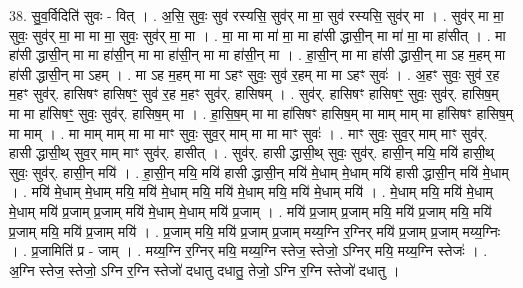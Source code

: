 \documentclass[17pt]{extarticle}
\begin{document}
38. सु॒व॒र्विदिति॑ सुवः - वित् । . अ॒सि॒ सुवः॒ सुव॑ रस्यसि॒ सुव॑र् मा मा॒ सुव॑ रस्यसि॒ सुव॑र् मा । . सुव॑र् मा मा॒ सुवः॒ सुव॑र् मा॒ मा मा मा॒ सुवः॒ सुव॑र् मा॒ मा । . मा॒ मा मा मा॑ मा॒ मा हा॑सी द्धासी॒न् मा मा॑ मा॒ मा हा॑सीत् । . मा हा॑सी द्धासी॒न् मा मा हा॑सी॒न् मा मा हा॑सी॒न् मा मा हा॑सी॒न् मा । . हा॒सी॒न् मा मा हा॑सी द्धासी॒न् मा ऽह म॒हम् मा हा॑सी द्धासी॒न् मा ऽहम् । . मा ऽह म॒हम् मा मा ऽहꣳ सुवः॒ सुव॑ र॒हम् मा मा ऽहꣳ सुवः॑ । . अ॒हꣳ सुवः॒ सुव॑ र॒ह म॒हꣳ सुव॑र्. हासिषꣳ हासिषꣳ॒॒ सुव॑ र॒ह म॒हꣳ सुव॑र्. हासिषम् । . सुव॑र्. हासिषꣳ हासिषꣳ॒॒ सुवः॒ सुव॑र्. हासिष॒म् मा मा हा॑सिषꣳ॒॒ सुवः॒ सुव॑र्. हासिष॒म् मा । . हा॒सि॒ष॒म् मा मा हा॑सिषꣳ हासिष॒म् मा माम् माम् मा हा॑सिषꣳ हासिष॒म् मा माम् । . मा माम् माम् मा मा माꣳ सुवः॒ सुव॒र् माम् मा मा माꣳ सुवः॑ । . माꣳ सुवः॒ सुव॒र् माम् माꣳ सुव॑र्. हासी द्धासी॒थ् सुव॒र् माम् माꣳ सुव॑र्. हासीत् । . सुव॑र्. हासी द्धासी॒थ् सुवः॒ सुव॑र्. हासी॒न् मयि॒ मयि॑ हासी॒थ् सुवः॒ सुव॑र्. हासी॒न् मयि॑ । . हा॒सी॒न् मयि॒ मयि॑ हासी द्धासी॒न् मयि॑ मे॒धाम् मे॒धाम् मयि॑ हासी द्धासी॒न् मयि॑ मे॒धाम् । . मयि॑ मे॒धाम् मे॒धाम् मयि॒ मयि॑ मे॒धाम् मयि॒ मयि॑ मे॒धाम् मयि॒ मयि॑ मे॒धाम् मयि॑ । . मे॒धाम् मयि॒ मयि॑ मे॒धाम् मे॒धाम् मयि॑ प्र॒जाम् प्र॒जाम् मयि॑ मे॒धाम् मे॒धाम् मयि॑ प्र॒जाम् । . मयि॑ प्र॒जाम् प्र॒जाम् मयि॒ मयि॑ प्र॒जाम् मयि॒ मयि॑ प्र॒जाम् मयि॒ मयि॑ प्र॒जाम् मयि॑ । . प्र॒जाम् मयि॒ मयि॑ प्र॒जाम् प्र॒जाम् मय्य॒ग्नि र॒ग्निर् मयि॑ प्र॒जाम् प्र॒जाम् मय्य॒ग्निः । . प्र॒जामिति॑ प्र - जाम् । . मय्य॒ग्नि र॒ग्निर् मयि॒ मय्य॒ग्नि स्तेज॒ स्तेजो॒ ऽग्निर् मयि॒ मय्य॒ग्नि स्तेजः॑ । . अ॒ग्नि स्तेज॒ स्तेजो॒ ऽग्नि र॒ग्नि स्तेजो॑ दधातु दधातु॒ तेजो॒ ऽग्नि र॒ग्नि स्तेजो॑ दधातु । \newline
\end{document}
